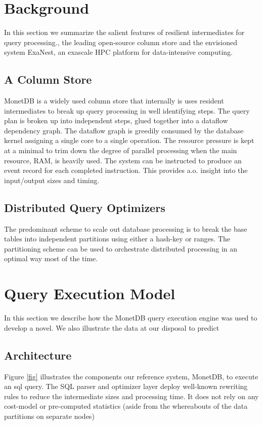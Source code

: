 \section{Background}
\label{Background}
In this section we summarize the salient features of resilient intermediates
for query processing., the leading open-source  column store and the envisioned
system ExaNest, an exascale HPC platform for data-intensive computing.

\subsection{A Column Store}
MonetDB is a widely used column store that internally is uses resident
intermediates to break up query processing in well identifying steps.
The query plan is broken up into independent steps, glued together into a
dataflow dependency graph.  The dataflow graph is greedily consumed by the
database kernel assigning a single core to a single operation.
The resource pressure is kept at a minimal to trim down the degree  of parallel
processing when the main resource, RAM, is heavily used.
The system can be instructed to produce an event record for each completed instruction.
This provides a.o. insight into the input/output sizes and timing.

\subsection{Distributed Query Optimizers}
The predominant scheme to scale out database processing is to break the base
tables into independent partitions using either a hash-key or ranges.
The partitioning scheme can be used to orchestrate distributed processing
in an optimal way most of the time.

\section{Query Execution Model}
In this section we describe how the MonetDB query execution engine was used
 to develop a novel. We also illustrate the data at our disposal to predict

\subsection{Architecture}
Figure \ref{fig} illustrates the components our reference system, MonetDB,
to execute an sql query. The SQL parser and optimizer layer deploy well-known
rewriting rules to reduce the intermediate sizes and processing time.
It does not rely on any cost-model or pre-computed statistics
(aside from the whereabouts of the data partitions on separate nodes)

